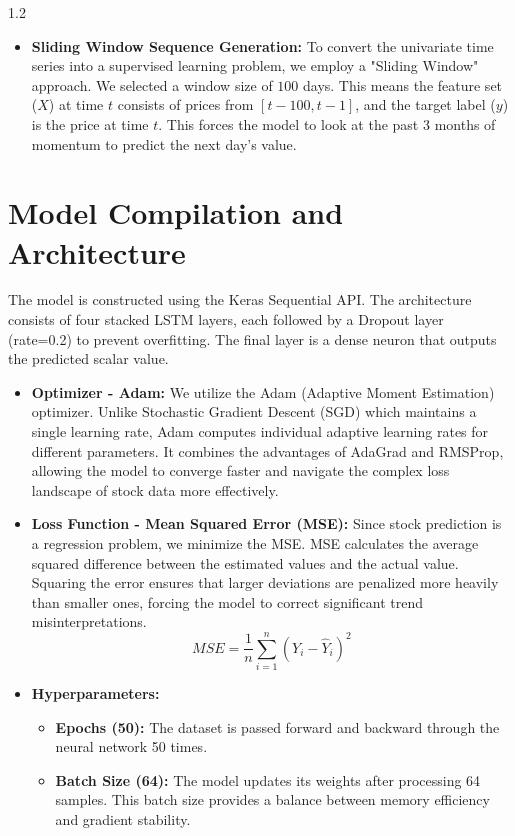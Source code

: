 \documentclass[12pt, a4paper]{report}
\begin{document}
\begin{spacing}{1.2}
\begin{itemize}
\item \textbf{Sliding Window Sequence Generation:} To convert the univariate time series into a supervised learning problem, we employ a "Sliding Window" approach. We selected a window size of $100$ days. This means the feature set ($X$) at time $t$ consists of prices from $[t-100, t-1]$, and the target label ($y$) is the price at time $t$. This forces the model to look at the past 3 months of momentum to predict the next day's value.
\end{itemize}\section{Model Compilation and Architecture}The model is constructed using the Keras Sequential API. The architecture consists of four stacked LSTM layers, each followed by a Dropout layer (rate=0.2) to prevent overfitting. The final layer is a dense neuron that outputs the predicted scalar value.\begin{itemize}\item \textbf{Optimizer - Adam:} We utilize the Adam (Adaptive Moment Estimation) optimizer. Unlike Stochastic Gradient Descent (SGD) which maintains a single learning rate, Adam computes individual adaptive learning rates for different parameters. It combines the advantages of AdaGrad and RMSProp, allowing the model to converge faster and navigate the complex loss landscape of stock data more effectively.\item \textbf{Loss Function - Mean Squared Error (MSE):} Since stock prediction is a regression problem, we minimize the MSE. MSE calculates the average squared difference between the estimated values and the actual value. Squaring the error ensures that larger deviations are penalized more heavily than smaller ones, forcing the model to correct significant trend misinterpretations.
\begin{equation}
    MSE = \frac{1}{n} \sum_{i=1}^{n} (Y_i - \hat{Y}_i)^2
\end{equation}
\vspace{0.5cm}
\item \textbf{Hyperparameters:}
\begin{itemize}
    \item \textbf{Epochs (50):} The dataset is passed forward and backward through the neural network 50 times.
    \item \textbf{Batch Size (64):} The model updates its weights after processing 64 samples. This batch size provides a balance between memory efficiency and gradient stability.
\end{itemize}
\end{itemize}


\end{spacing}
\end{document}
